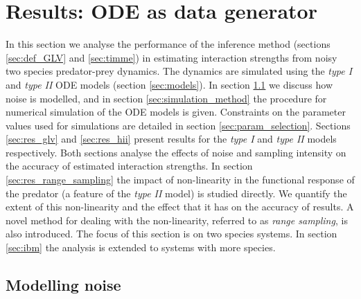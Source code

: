 \section{Results: ODE as data generator}
\label{sec:results}

In this section we analyse the performance of the inference method (sections \ref{sec:def_GLV} and \ref{sec:timme}) in estimating interaction strengths from noisy two species predator-prey dynamics. The dynamics are simulated using the \emph{type I} and \emph{type II} ODE models (section \ref{sec:models}). In section \ref{sec:noise} we discuss how noise is modelled, and in section \ref{sec:simulation_method} the procedure for numerical simulation of the ODE models is given. Constraints on the parameter values used for simulations are detailed in section \ref{sec:param_selection}. Sections \ref{sec:res_glv} and \ref{sec:res_hii} present results for the \emph{type I} and \emph{type II} models respectively. Both sections analyse the effects of noise and sampling intensity on the accuracy of estimated interaction strengths. In section \ref{sec:res_range_sampling} the impact of non-linearity in the functional response of the predator (a feature of the \emph{type II} model) is studied directly. We quantify the extent of this non-linearity and the effect that it has on the accuracy of results. A novel method for dealing with the non-linearity, referred to as \emph{range sampling}, is also introduced. The focus of this section is on two species systems. In section \ref{sec:ibm} the analysis is extended to systems with more species.

\subsection{Modelling noise}
\label{sec:noise}

